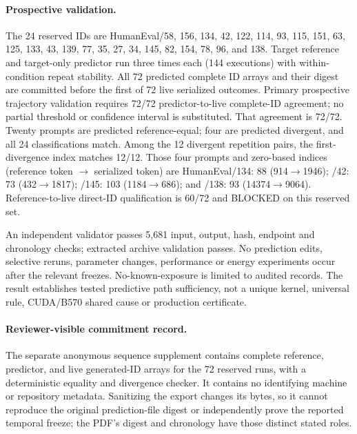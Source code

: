 \documentclass{article}
\begin{document}
\paragraph{Prospective validation.}
The 24 reserved IDs are HumanEval/58, 156, 134, 42, 122, 114, 93, 115, 151, 63, 125, 133, 43, 139, 77, 35, 27, 34, 145, 82, 154, 78, 96, and 138. Target reference and target-only predictor run three times each (144 executions) with within-condition repeat stability. All 72 predicted complete ID arrays and their digest are committed before the first of 72 live serialized outcomes. Primary prospective trajectory validation requires 72/72 predictor-to-live complete-ID agreement; no partial threshold or confidence interval is substituted. That agreement is 72/72. Twenty prompts are predicted reference-equal; four are predicted divergent, and all 24 classifications match. Among the 12 divergent repetition pairs, the first-divergence index matches 12/12. Those four prompts and zero-based indices (reference token $\rightarrow$ serialized token) are HumanEval/134: 88 (914$\rightarrow$1946); /42: 73 (432$\rightarrow$1817); /145: 103 (1184$\rightarrow$686); and /138: 93 (14374$\rightarrow$9064). Reference-to-live direct-ID qualification is 60/72 and BLOCKED on this reserved set.

An independent validator passes 5,681 input, output, hash, endpoint and chronology checks; extracted archive validation passes. No prediction edits, selective reruns, parameter changes, performance or energy experiments occur after the relevant freezes. No-known-exposure is limited to audited records. The result establishes tested predictive path sufficiency, not a unique kernel, universal rule, CUDA/B570 shared cause or production certificate.
\paragraph{Reviewer-visible commitment record.}

The separate anonymous sequence supplement contains complete reference, predictor, and live generated-ID arrays for the 72 reserved runs, with a deterministic equality and divergence checker. It contains no identifying machine or repository metadata. Sanitizing the export changes its bytes, so it cannot reproduce the original prediction-file digest or independently prove the reported temporal freeze; the PDF's digest and chronology have those distinct stated roles.



\end{document}
